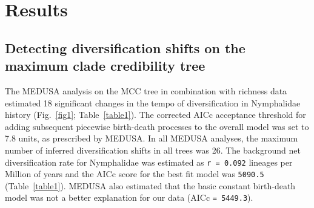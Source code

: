 \documentclass[10pt,letterpaper]{article}
\begin{document}
\section*{Results}

\subsection*{Detecting diversification shifts on the maximum clade
credibility tree}

The MEDUSA analysis on the MCC tree in combination with richness data
estimated 18 significant changes in the tempo of diversification in
Nymphalidae history (Fig.~\ref{fig1}; Table~\ref{table1}). The corrected AICc acceptance
threshold for adding subsequent piecewise birth-death processes to the
overall model was set to 7.8 units, as prescribed by MEDUSA. In all
MEDUSA analyses, the maximum number of inferred diversification shifts
in all trees was 26. The background net diversification rate for
Nymphalidae was estimated as \texttt{r = 0.092} lineages per Million of
years and the AICc score for the best fit model was \texttt{5090.5}
(Table~\ref{table1}). MEDUSA also estimated that the basic constant birth-death
model was not a better explanation for our data (AICc
\texttt{= 5449.3}).
\end{document}

